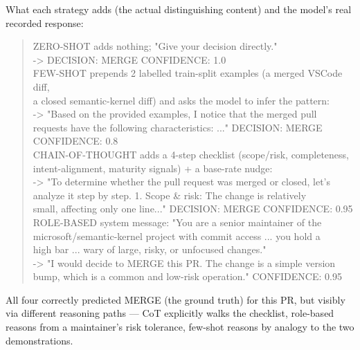 \documentclass{experimentreport}
\begin{document}
{What each strategy adds (the actual distinguishing content) and the model's real recorded response:

\begin{quote}
\ttfamily\footnotesize\noindent
ZERO-SHOT adds nothing; "Give your decision directly."\\
\hspace*{1.0em}  -> DECISION: MERGE  CONFIDENCE: 1.0\\[0.4em]
FEW-SHOT prepends 2 labelled train-split examples (a merged VSCode diff,\\
a closed semantic-kernel diff) and asks the model to infer the pattern:\\
\hspace*{1.0em}  -> "Based on the provided examples, I notice that the merged pull\\
\hspace*{3.0em}      requests have the following characteristics: ..." DECISION: MERGE\\
\hspace*{3.0em}      CONFIDENCE: 0.8\\[0.4em]
CHAIN-OF-THOUGHT adds a 4-step checklist (scope/risk, completeness,\\
intent-alignment, maturity signals) + a base-rate nudge:\\
\hspace*{1.0em}  -> "To determine whether the pull request was merged or closed, let's\\
\hspace*{3.0em}      analyze it step by step. 1. Scope \& risk: The change is relatively\\
\hspace*{3.0em}      small, affecting only one line..." DECISION: MERGE  CONFIDENCE: 0.95\\[0.4em]
ROLE-BASED system message: "You are a senior maintainer of the\\
microsoft/semantic-kernel project with commit access ... you hold a\\
high bar ... wary of large, risky, or unfocused changes."\\
\hspace*{1.0em}  -> "I would decide to MERGE this PR. The change is a simple version\\
\hspace*{3.0em}      bump, which is a common and low-risk operation." CONFIDENCE: 0.95
\end{quote}

All four correctly predicted MERGE (the ground truth) for this PR, but visibly via different
reasoning paths --- CoT explicitly walks the checklist, role-based reasons from a maintainer's risk
tolerance, few-shot reasons by analogy to the two demonstrations.

}
\end{document}
